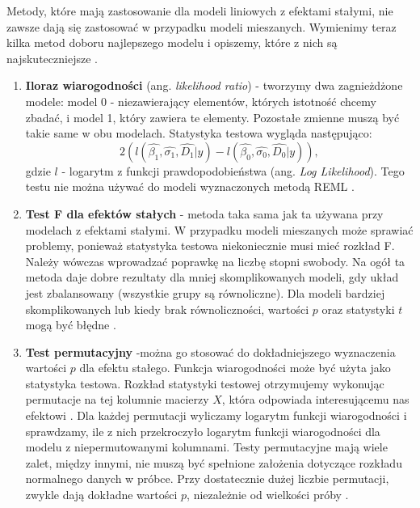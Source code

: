 \documentclass[12pt]{mwbk}
\theoremstyle{plain}
\theoremstyle{definition}
\theoremstyle{definition}
\begin{document}
Metody, które mają zastosowanie dla modeli liniowych z efektami stałymi, nie zawsze dają się zastosować w przypadku modeli mieszanych. Wymienimy teraz kilka metod doboru najlepszego modelu i opiszemy, które z nich są najskuteczniejsze \cite{faraway}.

\begin{enumerate}
	\item \textbf{Iloraz wiarogodności} (ang. \textit{likelihood ratio}) - tworzymy dwa zagnieżdżone modele: model 0 - niezawierający elementów, których istotność chcemy zbadać, i model 1, który zawiera te elementy. Pozostałe zmienne muszą być takie same w obu modelach.
	Statystyka testowa wygląda następująco:
	$$2(l(\hat{\beta_1}, \hat{\sigma_1}, \hat{D_1}|y)-l(\hat{\beta_0}, \hat{\sigma_0}, \hat{D_0}|y)),$$
	gdzie $l$ - logarytm z funkcji prawdopodobieństwa (ang. \textit{Log Likelihood}). Tego testu nie można używać do modeli wyznaczonych metodą REML \cite{faraway}.
	
	\item \textbf{Test F dla efektów stałych} - metoda taka sama jak ta używana przy modelach z efektami stałymi. W przypadku modeli mieszanych może sprawiać problemy, ponieważ statystyka testowa niekoniecznie musi mieć rozkład F. Należy wówczas wprowadzać poprawkę na liczbę stopni swobody. Na ogół ta metoda daje dobre rezultaty dla mniej skomplikowanych modeli, gdy układ jest zbalansowany (wszystkie grupy są równoliczne). Dla modeli bardziej skomplikowanych lub kiedy brak równoliczności, wartości $p$ oraz statystyki $t$ mogą być błędne \cite{faraway}.
	
	\item \textbf{Test permutacyjny} -można go stosować do dokładniejszego wyznaczenia wartości $p$ dla efektu stałego. Funkcja wiarogodności może być użyta jako statystyka testowa. Rozkład statystyki testowej otrzymujemy wykonując permutacje na tej kolumnie macierzy $X$, która odpowiada interesującemu nas efektowi \cite{biecek}. Dla każdej permutacji wyliczamy logarytm funkcji wiarogodności i sprawdzamy, ile z nich przekroczyło logarytm funkcji wiarogodności dla modelu z niepermutowanymi kolumnami. Testy permutacyjne mają wiele zalet, między innymi, nie muszą być spełnione założenia dotyczące rozkładu normalnego danych w próbce. Przy dostatecznie dużej liczbie permutacji, zwykle dają dokładne wartości $p$, niezależnie od wielkości próby \cite{bootstrap}.
	



\end{enumerate}
\end{document}

